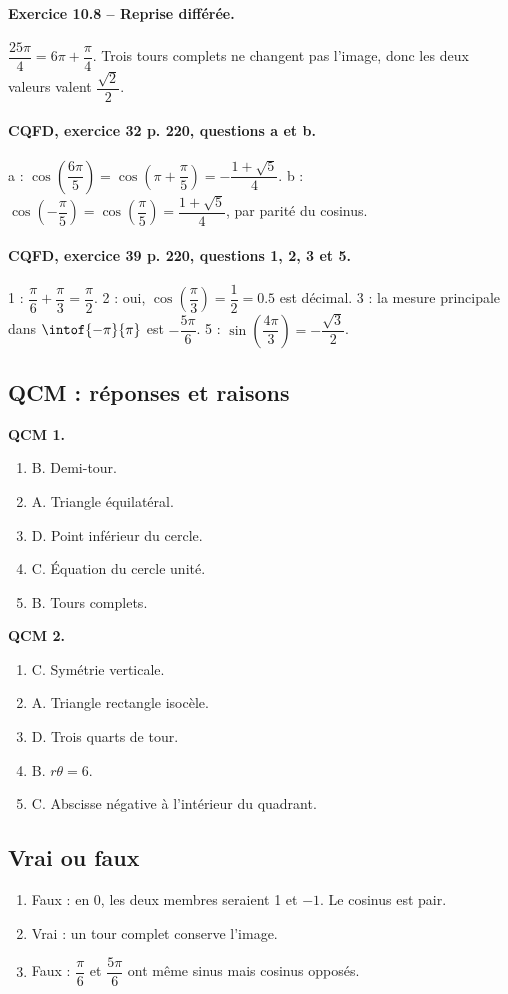 \paragraph{Exercice 10.8 -- Reprise différée.} $\dfrac{25\pi}{4}=6\pi +\dfrac{\pi}{4}$. Trois tours complets ne changent pas l’image, donc les deux valeurs valent $\dfrac{\sqrt 2}{2}$.
\paragraph{CQFD, exercice 32 p. 220, questions a et b.} a : $\cos(\dfrac{6\pi}5)=\cos(\pi+\dfrac\pi5)=-\dfrac{1+\sqrt5}{4}$. b : $\cos(-\dfrac\pi5)=\cos(\dfrac\pi5)=\dfrac{1+\sqrt5}{4}$, par parité du cosinus.
\paragraph{CQFD, exercice 39 p. 220, questions 1, 2, 3 et 5.} 1 : $\dfrac\pi6+\dfrac\pi3=\dfrac\pi2$. 2 : oui, $\cos(\dfrac\pi3)=\dfrac12=\num{0,5}$ est décimal. 3 : la mesure principale dans $\intof{-\pi}{\pi}$ est $-\dfrac{5\pi}6$. 5 : $\sin(\dfrac{4\pi}3)=-\dfrac{\sqrt3}2$.
\subsection*{QCM : réponses et raisons}
\textbf{QCM 1.}
\begin{enumerate}
\item B. Demi-tour.
\item A. Triangle équilatéral.
\item D. Point inférieur du cercle.
\item C. Équation du cercle unité.
\item B. Tours complets.
\end{enumerate}
\textbf{QCM 2.}
\begin{enumerate}
\item C. Symétrie verticale.
\item A. Triangle rectangle isocèle.
\item D. Trois quarts de tour.
\item B. $r\theta=6$.
\item C. Abscisse négative à l’intérieur du quadrant.
\end{enumerate}
\subsection*{Vrai ou faux}
\begin{enumerate}
\item Faux : en 0, les deux membres seraient 1 et $-1$. Le cosinus est pair.
\item Vrai : un tour complet conserve l’image.
\item Faux : $\dfrac{\pi}{6}$ et $\dfrac{5\pi}{6}$ ont même sinus mais cosinus opposés.
\end{enumerate}
